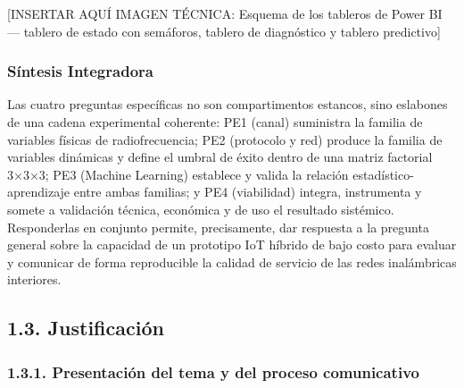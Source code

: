 \documentclass[
  12pt,
]{article}
\begin{document}
{[}INSERTAR AQUÍ IMAGEN TÉCNICA: Esquema de los tableros de Power BI —
tablero de estado con semáforos, tablero de diagnóstico y tablero
predictivo{]}

\subsubsection{Síntesis Integradora}\label{suxedntesis-integradora}

Las cuatro preguntas específicas no son compartimentos estancos, sino
eslabones de una cadena experimental coherente: PE1 (canal) suministra
la familia de variables físicas de radiofrecuencia; PE2 (protocolo y
red) produce la familia de variables dinámicas y define el umbral de
éxito dentro de una matriz factorial 3×3×3; PE3 (Machine Learning)
establece y valida la relación estadístico-aprendizaje entre ambas
familias; y PE4 (viabilidad) integra, instrumenta y somete a validación
técnica, económica y de uso el resultado sistémico. Responderlas en
conjunto permite, precisamente, dar respuesta a la pregunta general
sobre la capacidad de un prototipo IoT híbrido de bajo costo para
evaluar y comunicar de forma reproducible la calidad de servicio de las
redes inalámbricas interiores.

\subsection{1.3. Justificación}\label{justificaciuxf3n}

\subsubsection{1.3.1. Presentación del tema y del proceso
comunicativo}\label{presentaciuxf3n-del-tema-y-del-proceso-comunicativo}
\end{document}
